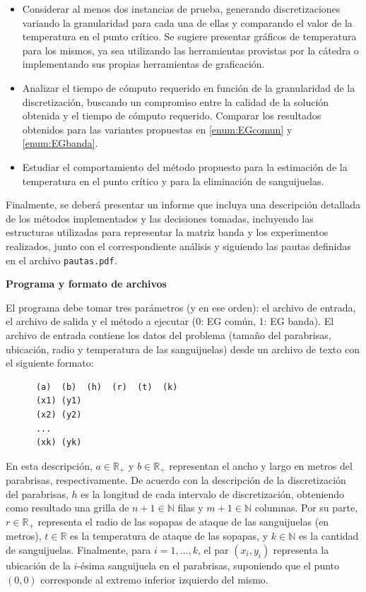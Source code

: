 \documentclass[double, 1.5in, 12pt]{beavtex}
\newcommand{\real}{\mathbb{R}}
\newcommand{\nat}{\mathbb{N}}
\newcommand{\atacante}{sanguijuela}
\newcommand{\objeto}{parabrisas}
\begin{document}
\begin{itemize}
\item Considerar al menos dos instancias de prueba, generando discretizaciones variando la granularidad para cada una de ellas y comparando el valor de la temperatura en el punto cr\'itico. Se sugiere presentar gr\'aficos de temperatura para los mismos, ya sea utilizando las herramientas provistas por la c\'atedra o implementando sus propias herramientas de graficaci\'on. 
\item Analizar el tiempo de c\'omputo requerido en funci\'on de la granularidad de la discretizaci\'on, buscando un compromiso entre la calidad de la soluci\'on obtenida y el tiempo de c\'omputo requerido. Comparar los resultados obtenidos para las variantes propuestas en \ref{enum:EGcomun} y \ref{enum:EGbanda}. 
\item Estudiar el comportamiento del m\'etodo propuesto para la estimaci\'on de la temperatura en el punto cr\'itico y para la eliminaci\'on de \atacante s.
\end{itemize}

Finalmente, se deber\'a presentar un informe que incluya una descripci\'on detallada de los m\'etodos implementados y las decisiones tomadas, incluyendo las estructuras utilizadas para representar la matriz banda  y los experimentos realizados, junto con el correspondiente an\'alisis y siguiendo las pautas definidas en el archivo \verb+pautas.pdf+.

{\noindent \bf Programa y formato de archivos}

El programa debe tomar tres par\'ametros (y en ese orden): el archivo de entrada, el archivo de salida y el m\'etodo a ejecutar (0: EG com\'un, 1: EG banda).
El archivo de entrada contiene los datos del problema (tama\~no del
\objeto, ubicaci\'on, radio y temperatura de las \atacante s) desde un
archivo de texto con el siguiente formato:

\begin{verbatim}
      (a)  (b)  (h)  (r)  (t)  (k)
      (x1) (y1)
      (x2) (y2)
      ...
      (xk) (yk)
\end{verbatim}

En esta descripci\'on, $a\in\real_+$ y $b\in\real_+$ representan el ancho
y largo en metros del \objeto, respectivamente. De acuerdo con la descripci\'on
de la discretizaci\'on del \objeto, $h$ es la longitud de cada intervalo de discretizaci\'on,
obteniendo como resultado una grilla de $n+1\in\nat$ filas y $m+1\in\nat$ columnas.
Por su parte, $r\in\real_+$ representa el radio de las sopapas de ataque de las
\atacante s (en metros), $t\in\real$ es la temperatura de ataque de las sopapas,
y $k\in\nat$ es la cantidad de \atacante s. Finalmente, para $i=1,\dots,k$,
el par $(x_i,y_i)$ representa la ubicaci\'on de la $i$-\'esima sanguijuela en el
\objeto, suponiendo que el punto $(0,0)$  corresponde al extremo inferior
izquierdo del mismo.
\end{document}
